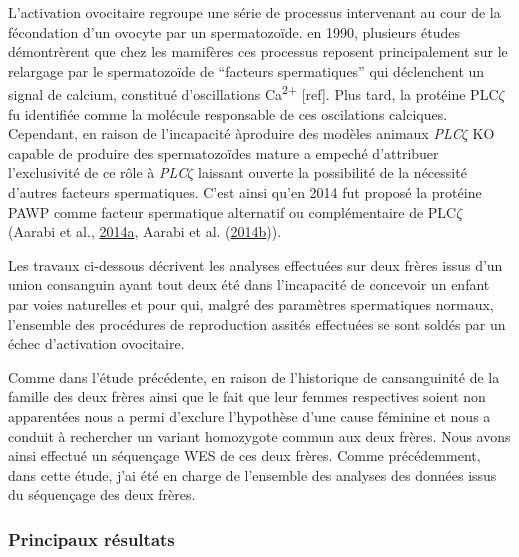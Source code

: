 \documentclass[12pt,twoside]{reedthesis}
\theoremstyle{definition}
\theoremstyle{definition}
\theoremstyle{remark}
\begin{document}
  L'activation ovocitaire regroupe une série de processus intervenant au
  cour de la fécondation d'un ovocyte par un spermatozoïde. en 1990,
  plusieurs études démontrèrent que chez les mamifères ces processus
  reposent principalement sur le relargage par le spermatozoïde de
  ``facteurs spermatiques'' qui déclenchent un signal de calcium,
  constitué d'oscillations Ca\textsuperscript{2+} {[}ref{]}. Plus tard, la
  protéine PLC\(\zeta\) fu identifiée comme la molécule responsable de ces
  oscilations calciques. Cependant, en raison de l'incapacité àproduire
  des modèles animaux \emph{PLC}\(\zeta\) KO capable de produire des
  spermatozoïdes mature a empeché d'attribuer l'exclusivité de ce rôle à
  \emph{PLC}\(\zeta\) laissant ouverte la possibilité de la nécessité
  d'autres facteurs spermatiques. C'est ainsi qu'en 2014 fut proposé la
  protéine PAWP comme facteur spermatique alternatif ou complémentaire de
  PLC\(\zeta\) (Aarabi et al.,
  \protect\hyperlink{ref-Aarabi2014}{2014}\protect\hyperlink{ref-Aarabi2014}{a},
  Aarabi et al.
  (\protect\hyperlink{ref-Aarabi2014a}{2014}\protect\hyperlink{ref-Aarabi2014a}{b})).
  
  Les travaux ci-dessous décrivent les analyses effectuées sur deux frères
  issus d'un union consanguin ayant tout deux été dans l'incapacité de
  concevoir un enfant par voies naturelles et pour qui, malgré des
  paramètres spermatiques normaux, l'ensemble des procédures de
  reproduction assités effectuées se sont soldés par un échec d'activation
  ovocitaire.
  
  Comme dans l'étude précédente, en raison de l'historique de
  cansanguinité de la famille des deux frères ainsi que le fait que leur
  femmes respectives soient non apparentées nous a permi d'exclure
  l'hypothèse d'une cause féminine et nous a conduit à rechercher un
  variant homozygote commun aux deux frères. Nous avons ainsi effectué un
  séquençage WES de ces deux frères. Comme précédemment, dans cette étude,
  j'ai été en charge de l'ensemble des analyses des données issus du
  séquençage des deux frères.
  
  \newpage
  
  
  
  \newpage
  
  \subsubsection{Principaux résultats}\label{principaux-resultats-1}
  
\end{document}
